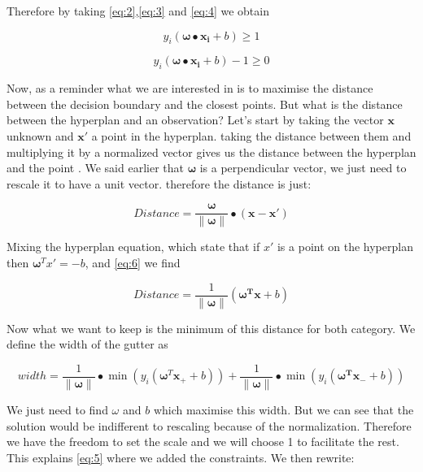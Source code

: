 \documentclass[a4paper,11pt]{article}
\numberwithin{equation}{section}
\begin{document}
Therefore by taking \ref{eq:2},\ref{eq:3} and \ref{eq:4} we obtain

\begin{equation*}
y_i(\boldsymbol{\omega}\bullet\boldsymbol{x_i}+b)\geq 1
\end{equation*}

\begin{equation}\label{eq:5}
y_i(\boldsymbol{\omega}\bullet\boldsymbol{x_i}+b)-1\geq 0
\end{equation}



Now, as a reminder what we are interested in is to maximise the distance between the decision boundary and the closest points. But what is the distance between the hyperplan and an observation? Let's start by taking the vector $\boldsymbol{x}$ unknown and	$\boldsymbol{x}'$ a point in the hyperplan. taking the distance between them and multiplying it by a normalized vector gives us the distance between the hyperplan and the point . We said earlier that $\boldsymbol{\omega}$ is a perpendicular vector, we just need to rescale it to have a unit vector. therefore the distance is just:

\begin{equation}\label{eq:6}
Distance = \frac{\boldsymbol{\omega}}{\|\boldsymbol{\omega}\|}\bullet{(\boldsymbol{x}-\boldsymbol{x}')}
\end{equation}

Mixing the hyperplan equation, which state that if $x'$ is a point on the hyperplan then $\boldsymbol{\omega}^Tx' = -b $, and \ref{eq:6} we find

\begin{equation}\label{eq:7}
Distance = \frac{1}{\|\boldsymbol{\omega}\|}{(\boldsymbol{\omega^T}\boldsymbol{x}+b)}
\end{equation}

Now what we want to keep is the minimum of this distance for both category. We define the width of the gutter as

\begin{equation*}
width = \frac{1}{\|\boldsymbol{\omega}\|}\bullet {\min(y_i(\boldsymbol{\omega}^T\boldsymbol{x_+}+b))}+\frac{1}{\|\boldsymbol{\omega}\|}\bullet {\min(y_i(\boldsymbol{\omega^T}\boldsymbol{x_-}+b))}
\end{equation*}

We just need to find $\omega$ and $b$ which maximise this width. But we can see that the solution would be indifferent to rescaling because of the normalization. Therefore we have the freedom to set the scale and we will choose 1 to facilitate the rest. This explains \ref{eq:5} where we added the constraints. We then rewrite:
\end{document}
